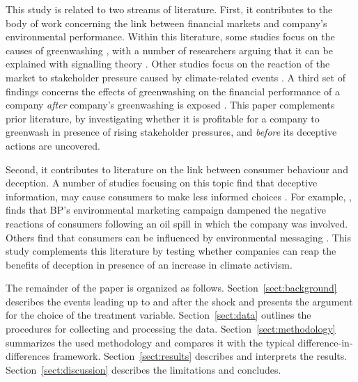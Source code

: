 \documentclass[12pt]{article}
\begin{document}
This study is related to two streams of literature. First, it contributes to the body of work concerning the link between financial markets and company's environmental performance. Within this literature, some studies focus on the causes of greenwashing \parencite{duchinSustainabilityGreenwashingEvidence2025, servaesImpactCorporateSocial2013,berroneDoesGreenwashingPay2017,kimGreenwashVsBrownwash2015,testaDoesItPay2018}, with a number of researchers arguing that it can be explained with signalling theory \parencite{lyonGreenwashCorporateEnvironmental2011,wuBadGreenwashingGood2020}. Other studies focus on the reaction of the market to stakeholder pressure caused by climate-related events \parencite{birindelliJustBlahBlah2023,schusterStockPriceReactions2023, diaz-raineyTrumpVsParis2021, bouzzineStockPriceReactions2021,cartellierCanInvestorsCurb2023, }. A third set of findings concerns the effects of greenwashing on the financial performance of a company \textit{after} company's greenwashing is exposed \parencite{tetiDoesGreenwashingAffect2024, karpoffReputationalPenaltiesEnvironmental2005, konarDoesMarketValue2001,torelliGreenwashingEnvironmentalCommunication2020}. This paper complements prior literature, by investigating whether it is profitable for a company to greenwash in presence of rising stakeholder pressures, and \textit{before} its deceptive actions are uncovered.


Second, it contributes to literature on the link between consumer behaviour and deception. A number of studies focusing on this topic find that deceptive information, may cause consumers to make less informed choices \parencite{raoDemandHealthyProducts2017,bronnenbergPharmacistsBuyBayer2015}. For example, \textcite{barrageAdvertisingEnvironmentalStewardship2020}, finds that BP's environmental marketing campaign dampened the negative reactions of consumers following an oil spill in which the company was involved. Others find that consumers can be influenced by environmental messaging \parencite{parguelCanEvokingNature2015,schmuckMisleadingConsumersGreen2018,nyilasyPerceivedGreenwashingInteractive2014}. This study complements this literature by testing whether companies can reap the benefits of deception in presence of an increase in climate activism.

The remainder of the paper is organized as follows. Section~\ref{sect:background} describes the events leading up to and after the shock and presents the argument for the choice of the treatment variable. Section~\ref{sect:data} outlines the procedures for collecting and processing the data. Section~\ref{sect:methodology} summarizes the used methodology and compares it with the typical difference-in-differences framework. Section~\ref{sect:results} describes and interprets the results. Section~\ref{sect:discussion} describes the limitations and concludes.
\end{document}
